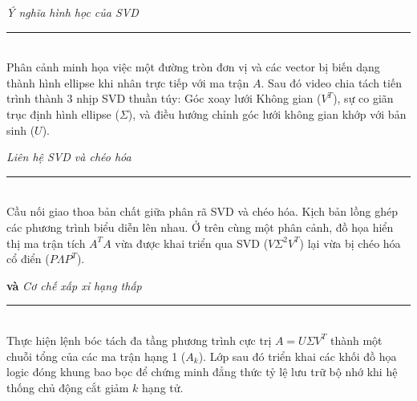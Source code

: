 \documentclass[a4paper]{article}
\begin{document}
\vspace{0.2cm}
\begin{mdframed}[linecolor=gray!50, linewidth=3pt, topline=false, bottomline=false, rightline=false, backgroundcolor=black!2, innerleftmargin=10pt, innertopmargin=8pt, innerbottommargin=8pt]
\textbf{\large {}} \hfill \textit{Ý nghĩa hình học của SVD}\\
\vspace{-0.2cm}\rule{\linewidth}{0.5pt}\vspace{0.2cm}\\
Phân cảnh minh họa việc một đường tròn đơn vị và các vector bị biến dạng thành hình ellipse khi nhân trực tiếp với ma trận $A$. Sau đó video chia tách tiến trình thành $3$ nhịp SVD thuần túy: Góc xoay lưới Không gian ($V^T$), sự co giãn trục định hình ellipse ($\Sigma$), và điều hướng chỉnh góc lưới không gian khớp với bản sinh ($U$).
\end{mdframed}

\vspace{0.2cm}
\begin{mdframed}[linecolor=gray!50, linewidth=3pt, topline=false, bottomline=false, rightline=false, backgroundcolor=black!2, innerleftmargin=10pt, innertopmargin=8pt, innerbottommargin=8pt]
\textbf{\large {}} \hfill \textit{Liên hệ SVD và chéo hóa}\\
\vspace{-0.2cm}\rule{\linewidth}{0.5pt}\vspace{0.2cm}\\
Cầu nối giao thoa bản chất giữa phân rã SVD và chéo hóa. Kịch bản lồng ghép các phương trình biểu diễn lên nhau. Ở trên cùng một phân cảnh, đồ họa hiển thị ma trận tích $A^TA$ vừa được khai triển qua SVD ($V\Sigma^2 V^T$) lại vừa bị chéo hóa cổ điển ($P \Lambda P^T$).
\end{mdframed}

\vspace{0.2cm}
\begin{mdframed}[linecolor=gray!50, linewidth=3pt, topline=false, bottomline=false, rightline=false, backgroundcolor=black!2, innerleftmargin=10pt, innertopmargin=8pt, innerbottommargin=8pt]
\textbf{\large {} và } \hfill \textit{Cơ chế xấp xỉ hạng thấp}\\
\vspace{-0.2cm}\rule{\linewidth}{0.5pt}\vspace{0.2cm}\\
Thực hiện lệnh bóc tách đa tầng phương trình cực trị $A = U\Sigma V^T$ thành một chuỗi tổng của các ma trận hạng 1 ($A_k$). Lớp  sau đó triển khai các khối đồ họa logic đóng khung bao bọc để chứng minh đẳng thức tỷ lệ lưu trữ bộ nhớ khi hệ thống chủ động cắt giảm $k$ hạng tử.
\end{mdframed}
\end{document}
